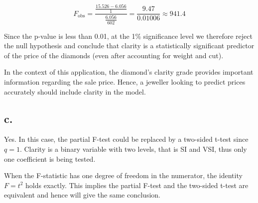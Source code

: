 \documentclass[
  11pt,
]{article}
\begin{document}
\[
F_{\text{obs}} = \frac{\frac{15.526 - 6.056}{1}}{\frac{6.056}{602}} = \frac{9.47}{0.01006} \approx 941.4
\]

Since the p-value is less than 0.01, at the 1\% significance level we
therefore reject the null hypothesis and conclude that clarity is a
statistically significant predictor of the price of the diamonds (even
after accounting for weight and cut).

In the context of this application, the diamond's clarity grade provides
important information regarding the sale price. Hence, a jeweller
looking to predict prices accurately should include clarity in the
model.

\subsection{c.~}\label{c.-2}

Yes. In this case, the partial F-test could be replaced by a two-sided
t-test since \(q = 1\). Clarity is a binary variable with two levels,
that is SI and VSI, thus only one coefficient is being tested.

When the F-statistic has one degree of freedom in the numerator, the
identity \(F = t^2\) holds exactly. This implies the partial F-test and
the two-sided t-test are equivalent and hence will give the same
conclusion.
\end{document}
